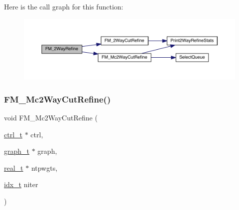 Here is the call graph for this function\+:\nopagebreak
\begin{figure}[H]
\begin{center}
\leavevmode
\includegraphics[width=350pt]{a00945_a1ffe9ee55eb23e345beb5da3e67c501a_cgraph}
\end{center}
\end{figure}
\mbox{\label{a00945_aaa49d065f964af00512da0c4b3d4cad6}} 
\subsubsection{\texorpdfstring{F\+M\+\_\+\+Mc2\+Way\+Cut\+Refine()}{FM\_Mc2WayCutRefine()}}
{\footnotesize\ttfamily void F\+M\+\_\+\+Mc2\+Way\+Cut\+Refine (\begin{DoxyParamCaption}\item[{\hyperlink{a00742}{ctrl\+\_\+t} $\ast$}]{ctrl,  }\item[{\hyperlink{a00734}{graph\+\_\+t} $\ast$}]{graph,  }\item[{\hyperlink{a00876_a1924a4f6907cc3833213aba1f07fcbe9}{real\+\_\+t} $\ast$}]{ntpwgts,  }\item[{\hyperlink{a00876_aaa5262be3e700770163401acb0150f52}{idx\+\_\+t}}]{niter }\end{DoxyParamCaption})}

